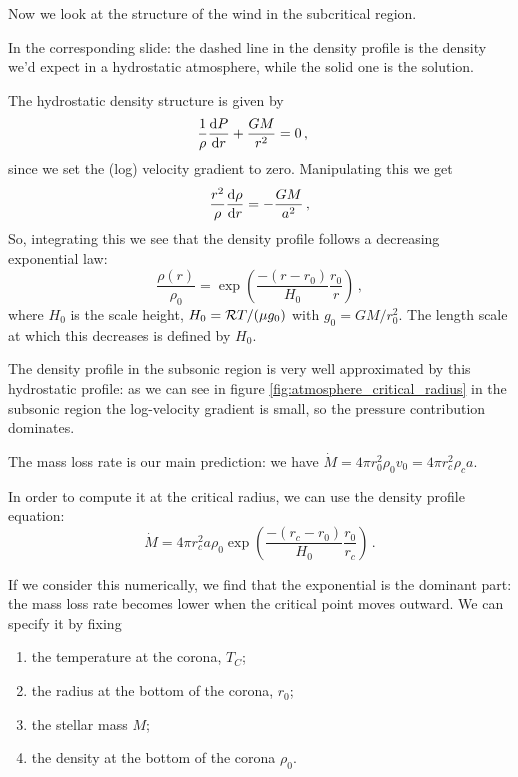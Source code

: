 \documentclass[main.tex]{subfiles}
\begin{document}
Now we look at the structure of the wind in the subcritical region.

In the corresponding slide: the dashed line in the density profile is the density we'd expect in a hydrostatic atmosphere, while the solid one is the solution.

The hydrostatic density structure is given by 
%
\begin{subequations}
\begin{align}
  \frac{1}{\rho } \dv{P}{r}  +\frac{GM }{r^2}  &= 0 
\,,
\end{align}
\end{subequations}
%
since we set the (log) velocity gradient to zero.
Manipulating this we get 
%
\begin{equation}
  \frac{r^2}{\rho } \dv{\rho }{r} = - \frac{GM}{a^2}
\,,
\end{equation}
%
So, integrating this we see that the density profile follows a decreasing exponential law: 
%
\begin{equation} \label{eq:density-profile-hydrostatic-equilibrium}
  \frac{\rho (r)}{\rho_0 } = \exp(\frac{-(r-r_0 )}{H_0 } \frac{r_0}{r} ) 
\,,
\end{equation}
%
where \(H_0 \) is the scale height, \(H_0 = \mathcal{R} T / \qty(\mu g_0 )\) with \(g_0 = GM / r_0^2\).
The length scale at which this decreases is defined by \(H_0 \). 

The density profile in the subsonic region is very well approximated by this hydrostatic profile: as we can see in figure \ref{fig:atmosphere_critical_radius} in the subsonic region the log-velocity gradient is small, so the pressure contribution dominates.

The mass loss rate is our main prediction: we have \(\dot{M } = 4 \pi r^2_0 \rho_0 v_0 = 4 \pi r_c^2\rho_c a\).

In order to compute it at the critical radius, we can use the density profile equation: 
%
\begin{equation}
  \dot{M} = 4 \pi r_c^2 a \rho_0 \exp(\frac{-(r_c - r_0 )}{H_0 } \frac{r_0 }{r_c}) 
\,.
\end{equation}
%

If we consider this numerically, we find that the exponential is the dominant part: the mass loss rate becomes lower when the critical point moves outward.
We can specify it by fixing 
%
\begin{enumerate}
    \item the temperature at the corona, \(T_C\);
    \item the radius at the bottom of the corona, \(r_0 \);
    \item the stellar mass \(M\);
    \item the density at the bottom of the corona \(\rho_0 \).
\end{enumerate}
\end{document}
